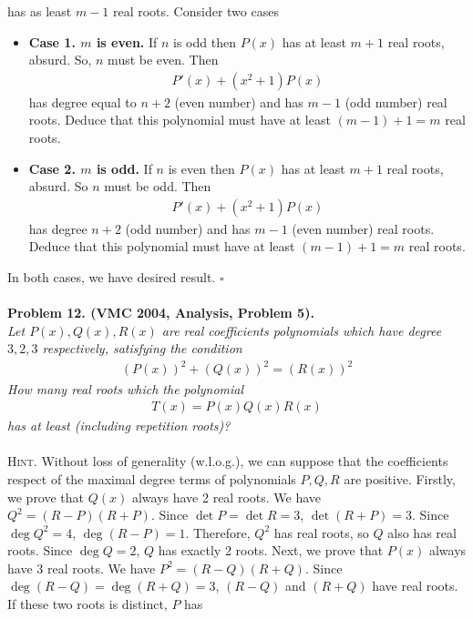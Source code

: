 \documentclass{article}
\numberwithin{equation}{section}
\begin{document}
has as least $m-1$ real roots. Consider two cases
\begin{itemize}
\item \textbf{Case 1. $m$ is even.} If $n$ is odd then $P(x)$ has at least $m+1$ real roots, absurd. So, $n$ must be even. Then 
\begin{align}
P'\left( x \right) + \left( {{x^2} + 1} \right)P\left( x \right)
\end{align}
has degree equal to $n+2$ (even number) and has $m-1$ (odd number) real roots. Deduce that this polynomial must have at least $(m-1)+1=m$ real roots.
\item \textbf{Case 2. $m$ is odd. } If $n$ is even then $P(x)$ has at least $m+1$ real roots, absurd. So $n$ must be odd. Then
\begin{align}
P'\left( x \right) + \left( {{x^2} + 1} \right)P\left( x \right)
\end{align}
has degree $n+2$ (odd number) and has $m-1$ (even number) real roots. Deduce that this polynomial must have at least $(m-1)+1=m$ real roots.
\end{itemize}
In both cases, we have desired result. \hfill $\square$\\
\\
\textbf{Problem 12. (VMC 2004, Analysis, Problem 5).}\\
\textit{Let $P(x),Q(x),R(x)$ are real coefficients polynomials which have degree $3,2,3$ respectively, satisfying the condition 
\begin{align}
{\left( {P\left( x \right)} \right)^2} + {\left( {Q\left( x \right)} \right)^2} = {\left( {R\left( x \right)} \right)^2}
\end{align}
How many real roots which the polynomial 
\begin{align}
T\left( x \right) = P\left( x \right)Q\left( x \right)R\left( x \right)
\end{align}
has at least (including repetition roots)?}\\
\\
\textsc{Hint.} Without loss of generality (w.l.o.g.), we can suppose that the coefficients respect of the maximal degree terms of polynomials $P,Q,R$ are positive. Firstly, we prove that $Q(x)$ always have 2 real roots. We have ${Q^2} = \left( {R - P} \right)\left( {R + P} \right)$. Since $\det P = \det R = 3$, $\det (R+P)=3$. Since $\deg {Q^2} = 4$, $\deg (R-P)=1$. Therefore, $Q^2$ has real roots, so $Q$ also has real roots. Since $\deg Q =2$, $Q$ has exactly 2 roots. Next, we prove that $P(x)$ always have 3 real roots. We have ${P^2} = \left( {R - Q} \right)\left( {R + Q} \right)$. Since $\deg \left( {R - Q} \right) = \deg \left( {R + Q} \right) = 3$, $(R-Q)$ and $(R+Q)$ have real roots. If these two roots is distinct, $P$ has 
\end{document}
